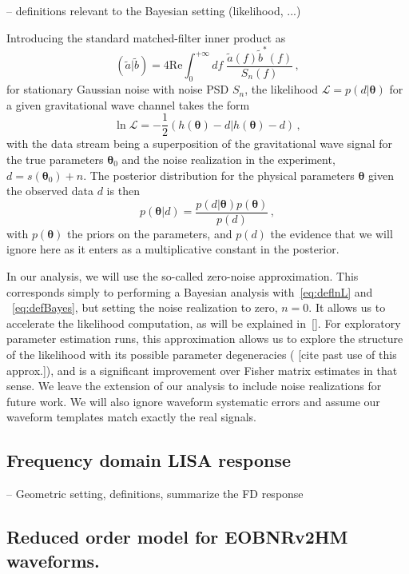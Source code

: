 \documentclass[aps,showpacs,twocolumn,prd,superscriptaddress,nofootinbib]{revtex4-1}
\newcommand{\be}{\begin{equation}}
\newcommand{\ee}{\end{equation}}
\newcommand\calL{{\mathcal{L}}}
\newcommand{\SM}[1]{{\color{Blue} #1}}
\begin{document}
-- definitions relevant to the Bayesian setting (likelihood, ...)

Introducing the standard matched-filter inner product as
\be
	\left( \tilde{a} | \tilde{b} \right) = 4 \mathrm{Re} \int_{0}^{+\infty} df \; \frac{\tilde{a}(f) \tilde{b}^{*}(f)}{S_{n}(f)} \,,
\ee
for stationary Gaussian noise with noise PSD $S_{n}$, the likelihood $\calL = p(d | \bm{\theta})$ for a given gravitational wave channel takes the form
\be\label{eq:deflnL}
	\ln \calL = -\frac{1}{2} \left( h(\bm{\theta}) - d | h(\bm{\theta}) - d \right) \,,
\ee
with the data stream being a superposition of the gravitational wave signal for the true parameters $\bm{\theta}_{0}$ and the noise realization in the experiment, $d = s(\bm{\theta}_{0}) + n$. The posterior distribution for the physical parameters $\bm{\theta}$ given the observed data $d$ is then
\be\label{eq:defBayes}
	p\left( \bm{\theta} | d \right) = \frac{p(d | \bm{\theta})p(\bm{\theta})}{p(d)}\,,
\ee
with $p(\bm{\theta})$ the priors on the parameters, and $p(d)$ the evidence that we will ignore here as it enters as a multiplicative constant in the posterior.

In our analysis, we will use the so-called zero-noise approximation. This corresponds simply to performing a Bayesian analysis with~\eqref{eq:deflnL} and ~\eqref{eq:defBayes}, but setting the noise realization to zero, $n=0$. It allows us to accelerate the likelihood computation, as will be explained in~\ref{}. For exploratory parameter estimation runs, this approximation allows us to explore the structure of the likelihood with its possible parameter degeneracies (\SM{[cite past use of this approx.]}), and is a significant improvement over Fisher matrix estimates in that sense. We leave the extension of our analysis to include noise realizations for future work. We will also ignore waveform systematic errors and assume our waveform templates match exactly the real signals.


\subsection{Frequency domain LISA response}
\label{sec:response}

-- Geometric setting, definitions, summarize the FD response


\subsection{Reduced order model for EOBNRv2HM waveforms.}
\label{sec:waveforms}
\end{document}

